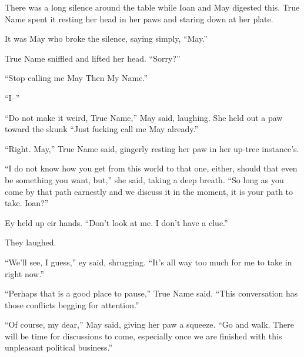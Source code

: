 There was a long silence around the table while Ioan and May digested this. True Name spent it resting her head in her paws and staring down at her plate.

It was May who broke the silence, saying simply, ``May.''

True Name sniffled and lifted her head. ``Sorry?''

``Stop calling me May Then My Name.''

``I--''

``Do not make it weird, True Name,'' May said, laughing. She held out a paw toward the skunk ``Just fucking call me May already.''

``Right. May,'' True Name said, gingerly resting her paw in her up-tree instance's.

``I do not know how you get from this world to that one, either, should that even be something you want, but,'' she said, taking a deep breath. ``So long as you come by that path earnestly and we discuss it in the moment, it is your path to take. Ioan?''

Ey held up eir hands. ``Don't look at me. I don't have a clue.''

They laughed.

``We'll see, I guess,'' ey said, shrugging. ``It's all way too much for me to take in right now.''

``Perhaps that is a good place to pause,'' True Name said. ``This conversation has those conflicts begging for attention.''

``Of course, my dear,'' May said, giving her paw a squeeze. ``Go and walk. There will be time for discussions to come, especially once we are finished with this unpleasant political business.''
